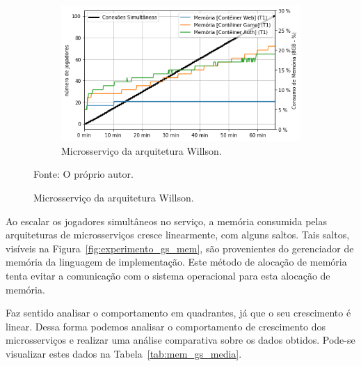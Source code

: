 \begin{figure}[htb!]
    \begin{subfigure}{0.5\textwidth}
        \centering
        \includegraphics[width=.95\linewidth]{figuras/testes/w_mem_game.png}
        \caption{Microsserviço da arquitetura Willson.}
        \label{fig:w_mem_game}
    \end{subfigure}

    \vspace{-0.3cm}
    Fonte: O próprio autor.
\end{figure}

Ao escalar os jogadores simultâneos no serviço, a memória consumida pelas arquiteturas de microsserviços cresce linearmente, com alguns saltos.
%
Tais saltos, visíveis na Figura~\ref{fig:experimento_gs_mem}, são provenientes do gerenciador de memória da linguagem de implementação.
%
Este método de alocação de memória tenta evitar a comunicação com o sistema operacional para esta alocação de memória.


Faz sentido analisar o comportamento em quadrantes, já que o seu crescimento é linear.
%
Dessa forma podemos analisar o comportamento de crescimento dos microsserviços e realizar uma análise comparativa sobre os dados obtidos.
%
Pode-se visualizar estes dados na Tabela~\ref{tab:mem_gs_media}.

